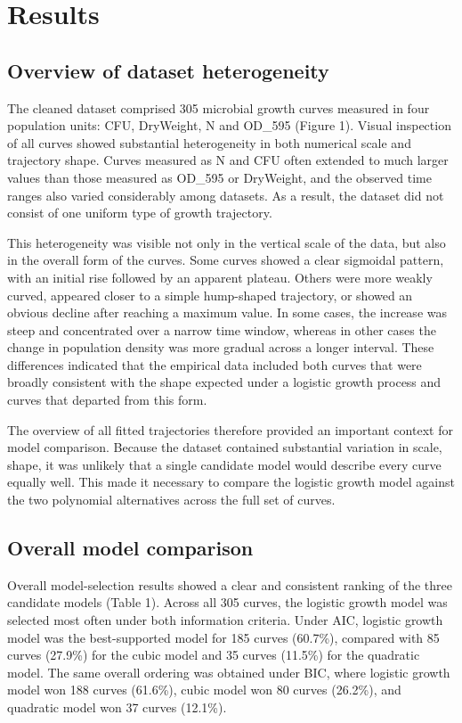\documentclass[11pt]{article}
\begin{document}
\section{Results}

\subsection{Overview of dataset heterogeneity}

The cleaned dataset comprised 305 microbial growth curves measured in four population units: CFU, DryWeight, N and OD\_595 (Figure 1). Visual inspection of all curves showed substantial heterogeneity in both numerical scale and trajectory shape. Curves measured as N and CFU often extended to much larger values than those measured as OD\_595 or DryWeight, and the observed time ranges also varied considerably among datasets. As a result, the dataset did not consist of one uniform type of growth trajectory.

This heterogeneity was visible not only in the vertical scale of the data, but also in the overall form of the curves. Some curves showed a clear sigmoidal pattern, with an initial rise followed by an apparent plateau. Others were more weakly curved, appeared closer to a simple hump-shaped trajectory, or showed an obvious decline after reaching a maximum value. In some cases, the increase was steep and concentrated over a narrow time window, whereas in other cases the change in population density was more gradual across a longer interval. These differences indicated that the empirical data included both curves that were broadly consistent with the shape expected under a logistic growth process and curves that departed from this form.

The overview of all fitted trajectories therefore provided an important context for model comparison. Because the dataset contained substantial variation in scale, shape, it was unlikely that a single candidate model would describe every curve equally well. This made it necessary to compare the logistic growth model against the two polynomial alternatives across the full set of curves.


\subsection{Overall model comparison}

Overall model-selection results showed a clear and consistent ranking of the three candidate models (Table 1). Across all 305 curves, the logistic growth model was selected most often under both information criteria. Under AIC, logistic growth model was the best-supported model for 185 curves (60.7\%), compared with 85 curves (27.9\%) for the cubic model and 35 curves (11.5\%) for the quadratic model. The same overall ordering was obtained under BIC, where logistic growth model won 188 curves (61.6\%), cubic model won 80 curves (26.2\%), and quadratic model won 37 curves (12.1\%).
\end{document}
